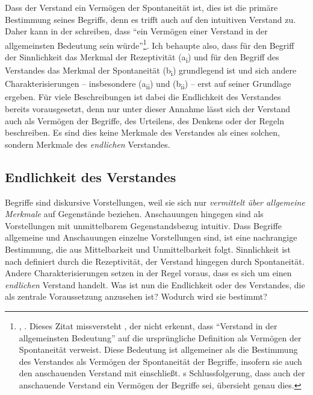 Dass der Verstand ein Vermögen der Spontaneität ist, dies ist die primäre
Bestimmung seines Begriffs, denn es trifft auch auf den intuitiven Verstand zu.
Daher kann  in der 
schreiben, dass \enquote{ein Vermögen einer  {\punkt} Verstand in der allgemeinsten Bedeutung sein
würde}\footnote{\cite[][\S~77]{Kant:KritikderUrteilskraft2009},
\cite[][V: 406.21--24]{Kant:GesammelteWerke1900ff.}. Dieses Zitat missversteht
\textcite[vgl.][285]{Westphal:KantHegelandtheFateofenquotetheIntuitiveIntellect2000},
der nicht erkennt, dass \enquote{Verstand in der allgemeinsten Bedeutung} auf
die ursprüngliche Definition als Vermögen der Spontaneität verweist. Diese
Bedeutung ist allgemeiner als die Bestimmung des Verstandes als Vermögen der
Spontaneität der Begriffe, insofern sie auch den anschauenden Verstand mit
einschließt.
s
Schlussfolgerung, dass auch der anschauende Verstand ein Vermögen der Begriffe
sei, übersieht genau dies.}.
Ich behaupte also, dass für den Begriff der Sinnlichkeit das Merkmal der
Rezeptivität (a\textsubscript{i}) und für den Begriff des Verstandes das
Merkmal der Spontaneität (b\textsubscript{i}) grundlegend ist und sich andere
Charakterisierungen -- insbesondere (a\textsubscript{ii}) und
(b\textsubscript{ii}) -- erst auf seiner Grundlage ergeben. Für viele
Beschreibungen ist dabei die Endlichkeit des Verstandes bereits vorausgesetzt,
denn nur unter dieser Annahme lässt sich der Verstand auch als Vermögen der
Begriffe, des Urteilens, des Denkens oder der Regeln beschreiben. Es sind dies
keine Merkmale des Verstandes als eines solchen, sondern Merkmale des
\emph{endlichen} Verstandes.

\subsection{Endlichkeit des
Verstandes}\label{subsection:EndlichkeitdesVerstandes}
Begriffe sind diskursive Vorstellungen, weil sie sich nur \emph{vermittelt über
allgemeine Merkmale} auf Gegenstände beziehen. Anschauungen hingegen sind als
Vorstellungen mit unmittelbarem Gegenstandsbezug intuitiv. Dass Begriffe
allgemeine und Anschauungen einzelne Vorstellungen sind, ist eine nachrangige
Bestimmung, die aus Mittelbarkeit und Unmittelbarkeit folgt. Sinnlichkeit ist
nach  definiert durch die Rezeptivität, der Verstand
hingegen durch Spontaneität. Andere Charakterisierungen setzen in der Regel
voraus, dass es sich um einen \emph{endlichen} Verstand handelt. Was ist nun die
Endlichkeit oder  des Verstandes, die als
zentrale Voraussetzung anzusehen ist? Wodurch wird sie bestimmt?

